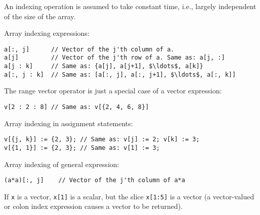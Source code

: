 \begin{nonnormative}
An indexing operation is assumed to take constant time, i.e., largely independent of the size of the array.
\end{nonnormative}

\begin{example}
Array indexing expressions:
\begin{lstlisting}[language=modelica]
a[:, j]      // Vector of the j'th column of a.
a[j]         // Vector of the j'th row of a. Same as: a[j, :]
a[j : k]     // Same as: {a[j], a[j+1], $\ldots$, a[k]}
a[:, j : k]  // Same as: [a[:, j], a[:, j+1], $\ldots$, a[:, k]]
\end{lstlisting}
The range vector operator is just a special case of a vector expression:
\begin{lstlisting}[language=modelica]
v[2 : 2 : 8] // Same as: v[{2, 4, 6, 8}]
\end{lstlisting}
Array indexing in assignment statements:
\begin{lstlisting}[language=modelica]
v[{j, k}] := {2, 3}; // Same as: v[j] := 2; v[k] := 3;
v[{1, 1}] := {2, 3}; // Same as: v[1] := 3;
\end{lstlisting}
Array indexing of general expression:
\begin{lstlisting}[language=modelica]
(a*a)[:, j]    // Vector of the j'th column of a*a
\end{lstlisting}
If \lstinline!x! is a vector, \lstinline!x[1]! is a scalar, but the slice \lstinline!x[1:5]! is a vector
(a vector-valued or colon index expression causes a vector to be returned).
\end{example}

